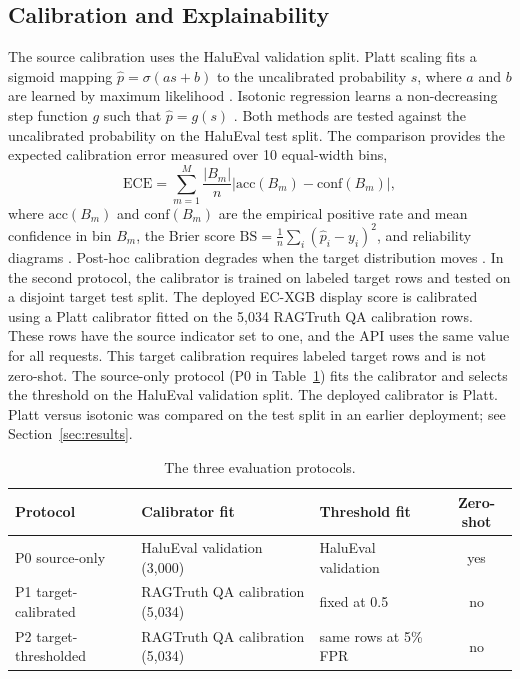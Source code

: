 \documentclass[a4paper,fleqn]{cas-sc}
\begin{document}
\subsection{Calibration and Explainability}

The source calibration uses the HaluEval validation split. Platt scaling fits a sigmoid mapping $\hat{p} = \sigma(a s + b)$ to the uncalibrated probability $s$, where $a$ and $b$ are learned by maximum likelihood \cite{platt}. Isotonic regression learns a non-decreasing step function $g$ such that $\hat{p} = g(s)$ \cite{isotonic}. Both methods are tested against the uncalibrated probability on the HaluEval test split. The comparison provides the expected calibration error measured over 10 equal-width bins,
\begin{equation}
  \mathrm{ECE} = \sum_{m=1}^{M} \frac{|B_m|}{n} \left| \mathrm{acc}(B_m) - \mathrm{conf}(B_m) \right|,
\end{equation}
where $\mathrm{acc}(B_m)$ and $\mathrm{conf}(B_m)$ are the empirical positive rate and mean confidence in bin $B_m$, the Brier score $\mathrm{BS} = \frac{1}{n}\sum_i (\hat{p}_i - y_i)^2$, and reliability diagrams \cite{guo}. Post-hoc calibration degrades when the target distribution moves \cite{gasparin2024distance}. In the second protocol, the calibrator is trained on labeled target rows and tested on a disjoint target test split. The deployed EC-XGB display score is calibrated using a Platt calibrator fitted on the 5{,}034 RAGTruth QA calibration rows. These rows have the source indicator set to one, and the API uses the same value for all requests. This target calibration requires labeled target rows and is not zero-shot. The source-only protocol (P0 in Table~\ref{tab:protocols}) fits the calibrator and selects the threshold on the HaluEval validation split. The deployed calibrator is Platt. Platt versus isotonic was compared on the test split in an earlier deployment; see Section~\ref{sec:results}.

\begin{table}[pos=htbp]
  \centering
  \caption{The three evaluation protocols.}
  \label{tab:protocols}
  \begin{tabular}{lllc}
    \toprule
    \textbf{Protocol}     & \textbf{Calibrator fit}           & \textbf{Threshold fit} & \textbf{Zero-shot} \\
    \midrule
    P0 source-only        & HaluEval validation (3{,}000)     & HaluEval validation    & yes                \\
    P1 target-calibrated  & RAGTruth QA calibration (5{,}034) & fixed at 0.5           & no                 \\
    P2 target-thresholded & RAGTruth QA calibration (5{,}034) & same rows at 5\% FPR   & no                 \\
    \bottomrule
  \end{tabular}
\end{table}
\end{document}
